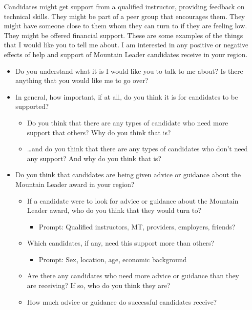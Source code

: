 \documentclass[
  12pt,
  a4paper,
]{book}
\providecommand{\tightlist}{%
  \setlength{\itemsep}{0pt}\setlength{\parskip}{0pt}}
\begin{document}
Candidates might get support from a qualified instructor, providing feedback on technical skills. They might be part of a peer group that encourages them. They might have someone close to them whom they can turn to if they are feeling low. They might be offered financial support. These are some examples of the things that I would like you to tell me about. I am interested in any positive or negative effects of help and support of Mountain Leader candidates receive in your region.

\begin{itemize}
\tightlist
\item
  Do you understand what it is I would like you to talk to me about? Is there anything that you would like me to go over?
\item
  In general, how important, if at all, do you think it is for candidates to be supported?

  \begin{itemize}
  \tightlist
  \item
    Do you think that there are any types of candidate who need more support that others? Why do you think that is?
  \item
    \ldots and do you think that there are any types of candidates who don't need any support? And why do you think that is?
  \end{itemize}
\item
  Do you think that candidates are being given advice or guidance about the Mountain Leader award in your region?

  \begin{itemize}
  \tightlist
  \item
    If a candidate were to look for advice or guidance about the Mountain Leader award, who do you think that they would turn to?

    \begin{itemize}
    \tightlist
    \item
      Prompt: Qualified instructors, MT, providers, employers, friends?
    \end{itemize}
  \item
    Which candidates, if any, need this support more than others?

    \begin{itemize}
    \tightlist
    \item
      Prompt: Sex, location, age, economic background
    \end{itemize}
  \item
    Are there any candidates who need more advice or guidance than they are receiving? If so, who do you think they are?
  \item
    How much advice or guidance do successful candidates receive?


\end{itemize}
\end{itemize}
\end{document}
